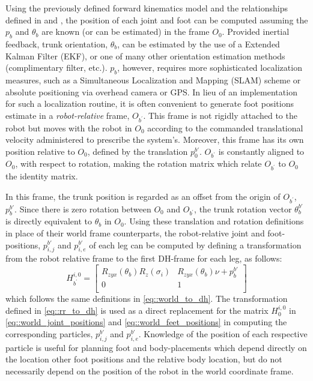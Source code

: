 			Using the previously defined forward kinematics model and the relationships defined in \label{eq::world_joint_positions} and \label{eq::world_feet_positions}, the position of each joint and foot can be computed assuming the $p_{b}$ and $\theta_{b}$ are known (or can be estimated) in the frame $O_{0}$. Provided inertial feedback, trunk orientation, $\theta_{b}$, can be estimated by the use of a Extended Kalman Filter (EKF), or one of many other orientation estimation methods (\IE complimentary filter, etc.). $p_{b}$, however, requires more sophisticated localization measures, such as a Simultaneous Localization and Mapping (SLAM) scheme or absolute positioning via overhead camera or GPS. In lieu of an implementation for such a localization routine, it is often convenient to generate foot positions estimate in a \emph{robot-relative} frame, $O_{b^{'}}$. This frame is not rigidly attached to the robot but moves with the robot in $O_{0}$ according to the commanded translational velocity administered to prescribe the system's. Moreover, this frame has its own position relative to $O_{0}$, defined by the translation $p_{0}^{b'}$. $O_{b^{'}}$ is constantly aligned to $O_{0}$, with respect to rotation, making the rotation matrix which relate $O_{b^{'}}$ to $O_{0}$ the identity matrix.

			In this frame, the trunk position is regarded as an offset from the origin of $O_{b^{'}}$, $p_{b}^{b'}$. Since there is zero rotation between $O_{0}$ and $O_{b^{'}}$, the trunk rotation vector $\theta_{b}^{b'}$ is directly equivalent to $\theta_{b}$ in $O_{0}$. Using these translation and rotation definitions in place of their world frame counterparts, the robot-relative joint and foot-positions, ${p}_{i,j}^{b'}$ and ${p}_{i,e}^{b'}$ of each \Ith leg can be computed by defining a transformation from the robot relative frame to the first DH-frame for each leg, as follows:
				\begin{equation}
					H_{b^{'}}^{i,0} = 
					\left[ 
					\begin{array}{c|c}
						R_{zyx}(\theta_{b}) R_{z}(\sigma_{i})	&R_{zyx}(\theta_{b}) \nu + {p}_{b}^{b'} 	\\ \hline
						0										&	1												\\
					\end{array} 
					\right]
					\label{eq::rr_to_dh}
				\end{equation}
			which follows the same definitions in \ref{eq::world_to_dh}.
			The transformation defined in \ref{eq::rr_to_dh} is used as a direct replacement for the matrix $H_{0}^{i,0}$ in \ref{eq::world_joint_positions} and \ref{eq::world_feet_positions} in computing the corresponding particles, ${p}_{i,j}^{b'}$ and ${p}_{i,e}^{b'}$. Knowledge of the position of each respective particle is useful for planning foot and body-placements which depend directly on the location other foot positions and the relative body location, but do not necessarily depend on the position of the robot in the world coordinate frame.
 
